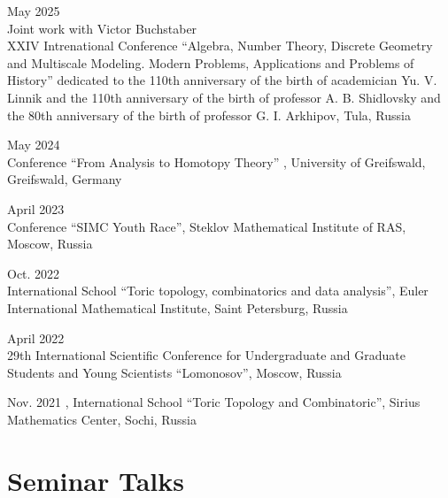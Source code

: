 \documentclass[11pt,letterpaper]{report}
\begin{document}
    \begin{tablist}
    
       \item{May 2025} \\ Joint work with Victor Buchstaber\\ XXIV Intrenational Conference
``Algebra, Number Theory, Discrete Geometry and Multiscale Modeling.
Modern Problems, Applications and Problems of History''
dedicated to the 110th anniversary of the birth of academician Yu. V. Linnik
and the 110th anniversary of the birth of professor A. B. Shidlovsky
and the 80th anniversary of the birth of professor G. I. Arkhipov, Tula, Russia
       
         
       \item{May 2024} \\ Conference ``From Analysis to Homotopy Theory'' , University of Greifswald, Greifswald, Germany 
    
       \item{April 2023} \\ Conference 	``SIMC Youth Race'', Steklov Mathematical Institute of RAS, Moscow, Russia
       
        \item{Oct. 2022} \\ International School ``Toric topology, combinatorics and data analysis'', Euler International Mathematical Institute, Saint Petersburg, Russia
       
       \item{April 2022} \\ 29th International Scientific Conference for Undergraduate and Graduate Students and Young Scientists ``Lomonosov'', Moscow, Russia
       
         \item{Nov. 2021} , International School
``Toric Topology and Combinatoric'', Sirius Mathematics Center, Sochi, Russia
          
    \end{tablist}
    
    
    
    
    
    \section*{Seminar Talks}
      
\end{document}
